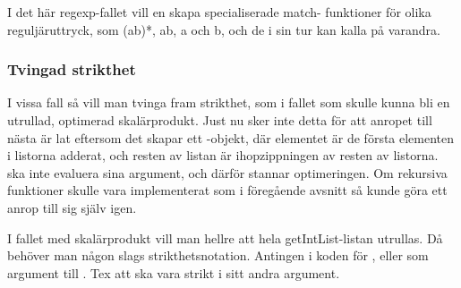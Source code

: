 \documentclass[Rapport]{subfiles}
\begin{document}
    I det här regexp-fallet vill en skapa specialiserade match-
funktioner för olika reguljäruttryck, som (ab)*, ab, a och b, och de i sin tur
kan kalla på varandra.

\subsubsection{Tvingad strikthet}

I vissa fall så vill man tvinga fram strikthet, som i fallet 
 som skulle kunna bli en utrullad,
optimerad skalärprodukt. Just nu sker inte detta för att anropet till nästa
 är lat eftersom det skapar ett -objekt, där elementet är de första
elementen i listorna adderat, och resten av listan är ihopzippningen av resten
av listorna.  ska inte evaluera sina argument, och därför stannar
optimeringen. Om rekursiva funktioner skulle vara implementerat som i föregående
avsnitt så kunde göra ett anrop till sig själv igen.

    I fallet med skalärprodukt vill man hellre att hela getIntList-listan 
utrullas. Då behöver man någon slags strikthetsnotation. Antingen i koden 
för , eller som argument till . Tex att  ska vara strikt i 
sitt andra argument.
\end{document}
